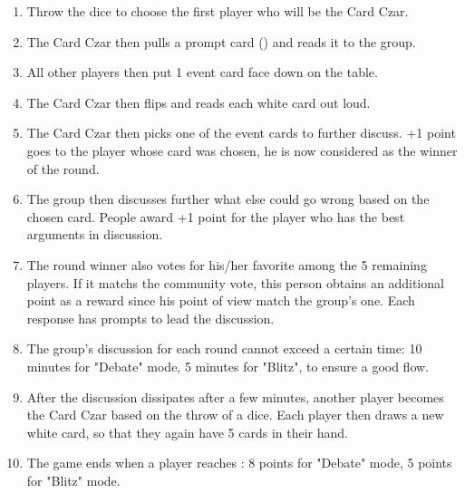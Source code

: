 \documentclass[grid,avery5371]{flashcards}
\begin{document}
\begin{flashcard}
\begin{multicols}{2}
\begin{enumerate}
        \item Throw the dice to choose the first player who will be the Card Czar.
        \item The Card Czar then pulls a prompt card () and reads it to the group.
        \item All other players then put 1 event card face down on the table.   
        \item The Card Czar then flips and reads each white card out loud.
        \item The Card Czar then picks one of the event cards to further discuss. +1 point goes to the player whose card was chosen, he is now considered as the winner of the round.
        \item The group then discusses further what else could go wrong based on the chosen card. People award +1 point for the player who has the best arguments in discussion. 
        \item The round winner also votes for his/her favorite among the 5 remaining players. If it matchs the community vote, this person  obtains an additional point as a reward since his point of view match the group's one. Each response has prompts to lead the discussion.
	    \item The group's discussion for each round cannot exceed a certain time: 10 minutes for "Debate" mode, 5 minutes for "Blitz", to ensure a good flow.
        \item After the discussion dissipates after a few minutes, another player becomes the Card Czar based on the throw of a dice. Each player then draws a new white card, so that they again have 5 cards in their hand.
	    \item The game ends when a player reaches : 8 points for "Debate" mode, 5 points for "Blitz" mode.

    \end{enumerate}
    \end{multicols}
\end{flashcard}
\end{document}
